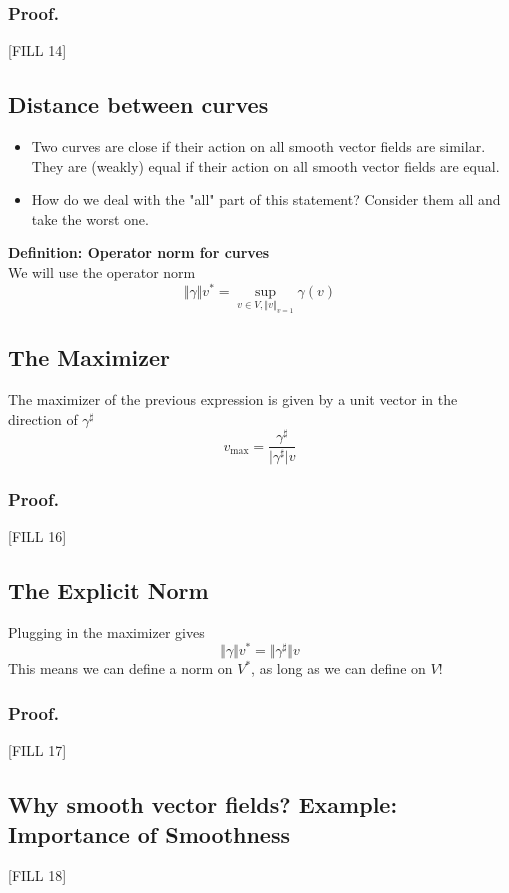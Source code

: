 \documentclass[10pt]{article}
\begin{document}
\subsubsection*{Proof.}
[FILL 14]

\subsection*{Distance between curves}
\begin{itemize}
    \item Two curves are close if their action on all smooth vector fields are similar.  They are (weakly) equal if their action on all smooth vector fields are equal.
    \item How do we deal with the "all" part of this statement?  Consider them all and take the worst one.
\end{itemize}
\textbf{Definition: Operator norm for curves}\\
We will use the operator norm
\[\Vert \gamma \Vert v^* = \sup_{v \in V, \Vert v \Vert_{v = 1}} \gamma(v)\]

\subsection*{The Maximizer}
The maximizer of the previous expression is given by a unit vector in the direction of $\gamma^\sharp$
\[v_{\text{max}} = \frac{\gamma^\sharp}{\vert \gamma^\sharp \vert v}\]

\subsubsection*{Proof.}
[FILL 16]

\subsection*{The Explicit Norm}
Plugging in the maximizer gives
\[\Vert \gamma \Vert v^* = \Vert \gamma^\sharp \Vert v\]
This means we can define a norm on $V^*$, as long as we can define on $V$!
\subsubsection*{Proof.}
[FILL 17]

\subsection*{Why smooth vector fields?  Example: Importance of Smoothness}
[FILL 18]
\end{document}
